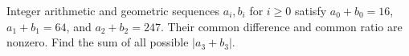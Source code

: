 Integer arithmetic and geometric sequences $a_i,b_i$ for $i\ge0$ satisfy $a_0+b_0=16$, $a_1+b_1=64$, and $a_2+b_2=247$. Their common difference and common ratio are nonzero. Find the sum of all possible $|a_3+b_3|$.
